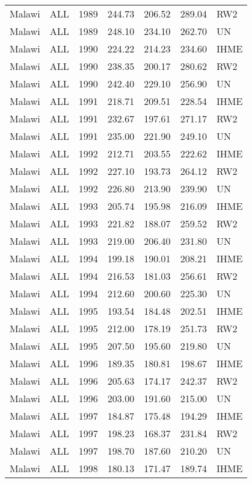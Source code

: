 \begin{longtable}{lllrrrl}
  Malawi & ALL & 1989 & 244.73 & 206.52 & 289.04 & RW2 \\ 
  Malawi & ALL & 1989 & 248.10 & 234.10 & 262.70 & UN \\ 
  Malawi & ALL & 1990 & 224.22 & 214.23 & 234.60 & IHME \\ 
  Malawi & ALL & 1990 & 238.35 & 200.17 & 280.62 & RW2 \\ 
  Malawi & ALL & 1990 & 242.40 & 229.10 & 256.90 & UN \\ 
  Malawi & ALL & 1991 & 218.71 & 209.51 & 228.54 & IHME \\ 
  Malawi & ALL & 1991 & 232.67 & 197.61 & 271.17 & RW2 \\ 
  Malawi & ALL & 1991 & 235.00 & 221.90 & 249.10 & UN \\ 
  Malawi & ALL & 1992 & 212.71 & 203.55 & 222.62 & IHME \\ 
  Malawi & ALL & 1992 & 227.10 & 193.73 & 264.12 & RW2 \\ 
  Malawi & ALL & 1992 & 226.80 & 213.90 & 239.90 & UN \\ 
  Malawi & ALL & 1993 & 205.74 & 195.98 & 216.09 & IHME \\ 
  Malawi & ALL & 1993 & 221.82 & 188.07 & 259.52 & RW2 \\ 
  Malawi & ALL & 1993 & 219.00 & 206.40 & 231.80 & UN \\ 
  Malawi & ALL & 1994 & 199.18 & 190.01 & 208.21 & IHME \\ 
  Malawi & ALL & 1994 & 216.53 & 181.03 & 256.61 & RW2 \\ 
  Malawi & ALL & 1994 & 212.60 & 200.60 & 225.30 & UN \\ 
  Malawi & ALL & 1995 & 193.54 & 184.48 & 202.51 & IHME \\ 
  Malawi & ALL & 1995 & 212.00 & 178.19 & 251.73 & RW2 \\ 
  Malawi & ALL & 1995 & 207.50 & 195.60 & 219.80 & UN \\ 
  Malawi & ALL & 1996 & 189.35 & 180.81 & 198.67 & IHME \\ 
  Malawi & ALL & 1996 & 205.63 & 174.17 & 242.37 & RW2 \\ 
  Malawi & ALL & 1996 & 203.00 & 191.60 & 215.00 & UN \\ 
  Malawi & ALL & 1997 & 184.87 & 175.48 & 194.29 & IHME \\ 
  Malawi & ALL & 1997 & 198.23 & 168.37 & 231.84 & RW2 \\ 
  Malawi & ALL & 1997 & 198.70 & 187.60 & 210.20 & UN \\ 
  Malawi & ALL & 1998 & 180.13 & 171.47 & 189.74 & IHME \\ 

\end{longtable}
